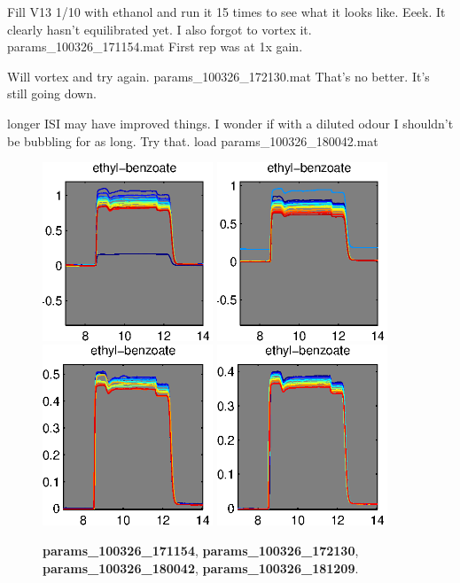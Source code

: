 \documentclass[a4paper]{report}
\begin{document}
\clearpage
Fill V13 1/10 with ethanol and run it 15 times to see what it looks
like. Eeek. It clearly hasn't equilibrated yet. I also forgot to vortex it. 
params\_100326\_171154.mat
First rep was at 1x gain. 


Will vortex and try again.  params\_100326\_172130.mat
That's no better. It's still going down. 

longer ISI may have improved things. I wonder if with a diluted odour
I shouldn't be bubbling for as long. Try that. 
load params\_100326\_180042.mat

\begin{figure}[h]
\centering
\includegraphics[width=2in]{params_100326_171154.eps}
\includegraphics[width=2in]{params_100326_172130.eps}
\includegraphics[width=2in]{params_100326_180042.eps}
\includegraphics[width=2in]{params_100326_181209.eps}
\caption{\textbf{params\_100326\_171154},
  \textbf{params\_100326\_172130},
 \textbf{params\_100326\_180042}, \textbf{params\_100326\_181209}.}
\end{figure}
\end{document}
